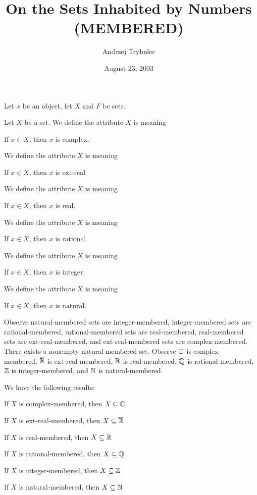 \documentclass{article}
\title{On the Sets Inhabited by Numbers (MEMBERED)}
\author{Andrzej Trybulec}
\date{August 23, 2003}
\begin{document}
Let $x$ be an object, let $X$ and $F$ be sets.
\begin{definition}
Let $X$ be a set.
We define the attribute $X$ is  meaning
\begin{defn}
\item If $x\in X$, then $x$ is complex.
\end{defn}
We define the attribute $X$ is  meaning
\begin{defn}
\item If $x\in X$, then $x$ is ext-real
\end{defn}
We define the attribute $X$ is  meaning
\begin{defn}
\item If $x\in X$, then $x$ is real.
\end{defn}
We define the attribute $X$ is  meaning
\begin{defn}
\item If $x\in X$, then $x$ is rational.
\end{defn}
We define the attribute $X$ is  meaning
\begin{defn}
\item If $x\in X$, then $x$ is integer.
\end{defn}
We define the attribute $X$ is  meaning
\begin{defn}
\item If $x\in X$, then $x$ is natural.
\end{defn}
\end{definition}

Observe natural-membered sets are integer-membered, integer-membered
sets are rational-membered, rational-membered sets are real-membered,
real-membered sets are ext-real-membered, and ext-real-membered sets are
complex-membered.
There exists a nonempty natural-membered set.
Observe $\mathbb{C}$ is complex-membered, $\overline{\mathbb{R}}$ is ext-real-membered, $\mathbb{R}$
is real-membered, $\mathbb{Q}$ is rational-membered, $\mathbb{Z}$ is integer-membered,
and $\mathbb{N}$ is natural-membered.

We have the following results:
\begin{thm}
\item\label{membered:1} If $X$ is complex-membered, then $X\subseteq\mathbb{C}$
\item\label{membered:2} If $X$ is ext-real-membered, then $X\subseteq\overline{\mathbb{R}}$
\item\label{membered:3} If $X$ is real-membered, then $X\subseteq\mathbb{R}$
\item\label{membered:4} If $X$ is rational-membered, then $X\subseteq\mathbb{Q}$
\item\label{membered:5} If $X$ is integer-membered, then $X\subseteq\mathbb{Z}$
\item\label{membered:6} If $X$ is natural-membered, then $X\subseteq\mathbb{N}$
\end{thm}
\end{document}
